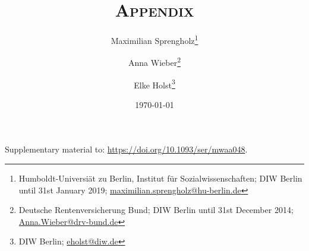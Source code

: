 \documentclass[a4paper,11pt]{scrartcl}
\begin{document}
\clearpage
{}
\pagestyle{plain}
\setcounter{page}{1}

\begin{titlepage}

	\title{\scshape{Appendix}}
	\subtitle{}
	\author{Maximilian Sprengholz\thanks{Humboldt-Universiät zu Berlin, Institut für Sozialwissenschaften; DIW Berlin until 31st January 2019; \href{mailto:maximilian.sprengholz@hu-berlin.de}{maximilian.sprengholz@hu-berlin.de}} \and Anna Wieber\thanks{Deutsche Rentenversicherung Bund; DIW Berlin until 31st December 2014; \href{mailto:Anna.Wieber@drv-bund.de}{Anna.Wieber@drv-bund.de}} \and Elke Holst\thanks{DIW Berlin; \href{mailto:eholst@diw.de}{eholst@diw.de}}}

	\date{\today}

	\maketitle

	\centering
	Supplementary material to: \href{https://doi.org/10.1093/ser/mwaa048}{https://doi.org/10.1093/ser/mwaa048}.
\end{titlepage}
\end{document}
